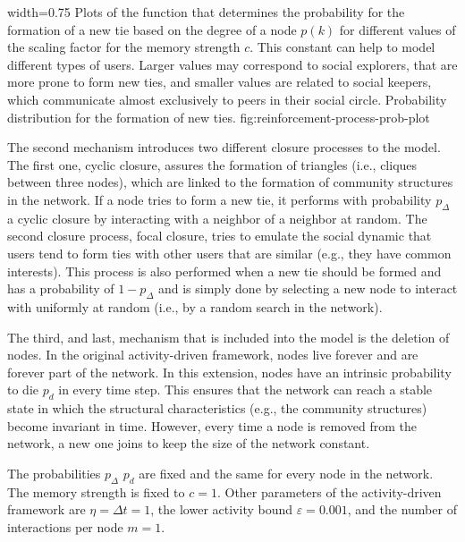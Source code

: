       {width=0.75\textwidth}
      {Plots of the function that determines the probability for the formation of a new tie based on the degree of a node \(p(k)\) for different values of the scaling factor for the memory strength \(c\). This constant can help to model different types of users. Larger values may correspond to social explorers, that are more prone to form new ties, and smaller values are related to social keepers, which communicate almost exclusively to peers in their social circle.}
      {Probability distribution for the formation of new ties.}
      {fig:reinforcement-process-prob-plot}

The second mechanism introduces two different closure processes to the model.
The first one, cyclic closure, assures the formation of triangles (i.e., cliques between three nodes), which are linked to the formation of community structures in the network.
If a node tries to form a new tie, it performs with probability \(p_{\Delta}\) a cyclic closure by interacting with a neighbor of a neighbor at random.
The second closure process, focal closure, tries to emulate the social dynamic that users tend to form ties with other users that are similar (e.g., they have common interests).
This process is also performed when a new tie should be formed and has a probability of \(1 - p_{\Delta}\) and is simply done by selecting a new node to interact with uniformly at random (i.e., by a random search in the network).

The third, and last, mechanism that is included into the model is the deletion of nodes.
In the original activity-driven framework, nodes live forever and are forever part of the network.
In this extension, nodes have an intrinsic probability to die \(p_{d}\) in every time step.
This ensures that the network can reach a stable state in which the structural characteristics (e.g., the community structures) become invariant in time.
However, every time a node is removed from the network, a new one joins to keep the size of the network constant.

The probabilities \(p_{\Delta}\) \(p_{d}\) are fixed and the same for every node in the network.
The memory strength is fixed to \(c = 1\).
Other parameters of the activity-driven framework are \(\eta = \Delta t = 1\), the lower activity bound \(\varepsilon = 0.001\), and the number of interactions per node \(m = 1\).



